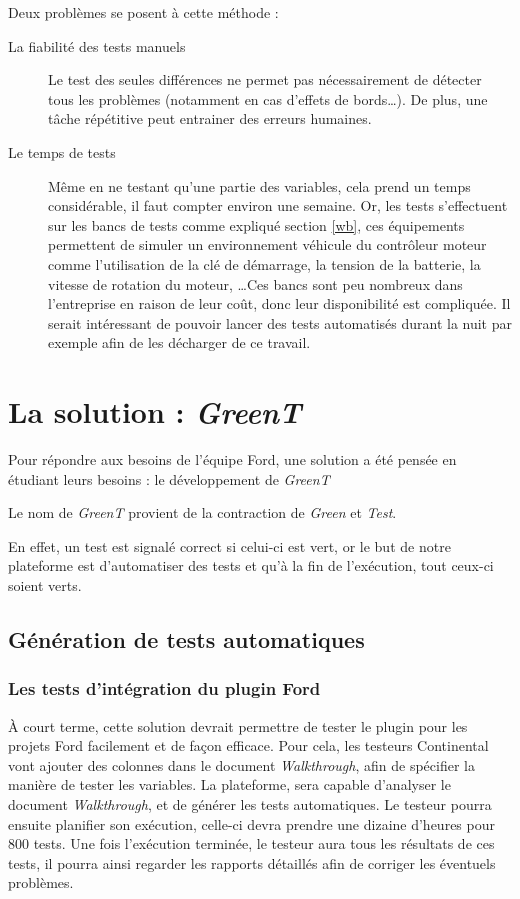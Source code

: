 	\vspace{20px}
	Deux problèmes se posent à cette méthode : 
	\begin{description}
		\item[La fiabilité des tests manuels] Le test des seules différences ne permet pas nécessairement de détecter tous les problèmes (notamment en cas d'effets de bords\ldots). De plus, une tâche répétitive peut entrainer des erreurs humaines.
		\item[Le temps de tests] Même en ne testant qu'une partie des variables, cela prend un temps considérable, il faut compter environ une semaine.\newline
			Or, les tests s'effectuent sur les bancs de tests comme expliqué section \ref{wb}, ces équipements permettent de simuler un environnement véhicule du contrôleur moteur comme
			l'utilisation de la clé de démarrage, la tension de la batterie, la vitesse de rotation du moteur, \ldots Ces bancs sont peu
			nombreux dans l'entreprise en raison de leur coût, donc leur disponibilité est compliquée. Il serait intéressant de pouvoir lancer
			des tests automatisés durant la nuit par exemple afin de les décharger de ce travail.
	\end{description}
	
\newpage
	\section{La solution : \textit{GreenT}}
	Pour répondre aux besoins de l'équipe Ford, une solution a été pensée en étudiant leurs besoins : le développement de \textit{GreenT}
	\begin{remarque}
		Le nom de \textit{GreenT} provient de la contraction de \textit{Green} et \textit{Test}.
		
		En effet, un test est signalé correct si celui-ci est vert, or le but de notre plateforme est d'automatiser des tests et qu'à la fin de l'exécution, tout ceux-ci soient verts.
	\end{remarque}
	
	\subsection{Génération de tests automatiques}
	\subsubsection{Les tests d'intégration du plugin Ford}
	À court terme, cette solution devrait permettre de tester le plugin pour les projets Ford facilement et de façon efficace. Pour cela, les testeurs Continental vont ajouter des colonnes dans le document \textit{Walkthrough}, afin de spécifier la manière de tester les variables. La plateforme, sera capable d'analyser le document \textit{Walkthrough}, et de générer les tests automatiques. Le testeur pourra ensuite planifier son exécution, celle-ci devra prendre une dizaine d'heures pour 800 tests. Une fois l'exécution terminée, le testeur aura tous les résultats de ces tests, il pourra ainsi regarder les rapports détaillés afin de corriger les éventuels problèmes.
	
